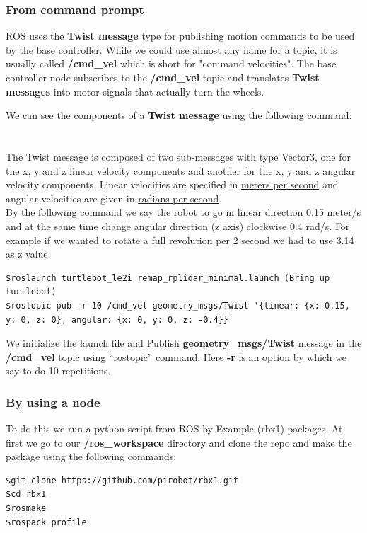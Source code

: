 \documentclass[10pt,a4paper]{article}
\begin{document}
\subsubsection{From command prompt}
ROS uses the \textbf{Twist message} type for publishing motion commands to be used by the base controller. While we could use almost any name for a topic, it is usually called \textbf{/cmd\_vel} which is short for "command velocities". The base controller node subscribes to the \textbf{/cmd\_vel} topic and translates \textbf{Twist messages} into motor signals that actually turn the wheels.

We can see the components of a \textbf{Twist message} using the following command:\\\\
\\

The Twist message is composed of two sub-messages with type Vector3, one for the x, y and z linear velocity components and another for the x, y and z angular velocity components. Linear velocities are specified in \underline{meters per second} and angular velocities are given in \underline{radians per second}.\\

By the following command we say the robot to go in linear direction 0.15 meter/s and at the same time change angular direction (z axis) clockwise 0.4 rad/s. For example if we wanted to rotate a full revolution per 2 second we had to use 3.14 as z value.
\begin{lstlisting}[frame=single] 
$roslaunch turtlebot_le2i remap_rplidar_minimal.launch (Bring up turtlebot)
$rostopic pub -r 10 /cmd_vel geometry_msgs/Twist '{linear: {x: 0.15, y: 0, z: 0}, angular: {x: 0, y: 0, z: -0.4}}'
\end{lstlisting}
We initialize the launch file and Publish \textbf{geometry\_msgs/Twist} message in the \textbf{/cmd\_vel} topic using ``rostopic'' command. Here \textbf{-r} is an option by which we say to do 10 repetitions.

\subsubsection{By using a node}
To do this we run a python script from ROS-by-Example (rbx1) packages. At first we go to our \textbf{/ros\_workspace} directory and clone the repo and make the package using the following commands:

\begin{lstlisting}[frame=single] 
$git clone https://github.com/pirobot/rbx1.git
$cd rbx1
$rosmake
$rospack profile
\end{lstlisting}
\end{document}
